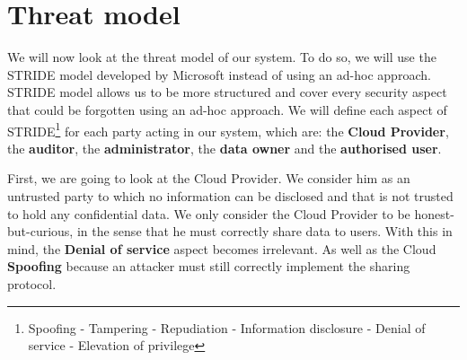 \documentclass[../main.tex]{subfiles}
\begin{document}
\section{Threat model}
\label{section:problem:threat_model}

\par We will now look at the threat model of our system. To do so, we will use the STRIDE model developed by Microsoft\cite{wiki:stride} instead of using an ad-hoc approach. STRIDE model allows us to be more structured and cover every security aspect that could be forgotten using an ad-hoc approach. We will define each aspect of STRIDE\footnote{Spoofing - Tampering - Repudiation - Information disclosure - Denial of service - Elevation of privilege} for each party acting in our system, which are: the \textbf{Cloud Provider}, the \textbf{auditor}, the \textbf{administrator}, the \textbf{data owner} and the \textbf{authorised user}.

\medbreak
\par First, we are going to look at the Cloud Provider. We consider him as an untrusted party to which no information can be disclosed and that is not trusted to hold any confidential data. We only consider the Cloud Provider to be honest-but-curious, in the sense that he must correctly share data to users. With this in mind, the \textbf{Denial of service} aspect becomes irrelevant. As well as the Cloud \textbf{Spoofing} because an attacker must still correctly implement the sharing protocol.\\
\end{document}
